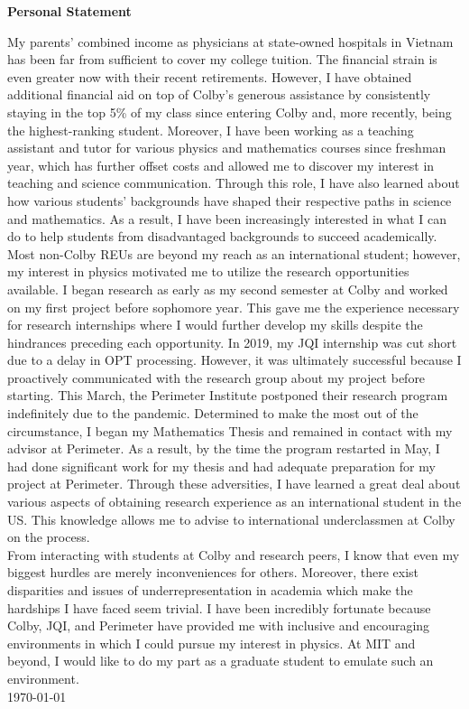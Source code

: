 \documentclass[12pt]{article}
\begin{document}
\begin{center}
	\textbf{Personal Statement}
\end{center}
My parents' combined income as physicians at state-owned hospitals in Vietnam has been far from sufficient to cover my college tuition. The financial strain is even greater now with their recent retirements. However,  I have obtained additional financial aid on top of Colby's generous assistance by consistently staying in the top 5\% of my class since entering Colby and, more recently, being the highest-ranking student. Moreover, I have been working as a teaching assistant and tutor for various physics and mathematics courses since freshman year, which has further offset costs and allowed me to discover my interest in teaching and science communication. Through this role, I have also learned about how various students' backgrounds have shaped their respective paths in science and mathematics. As a result, I have been increasingly interested in what I can do to help students from disadvantaged backgrounds to succeed academically. \\

Most non-Colby REUs are beyond my reach as an international student; however, my interest in physics motivated me to utilize the research opportunities available. I began research as early as my second semester at Colby and worked on my first project before sophomore year. This gave me the experience necessary for research internships where I would further develop my skills despite the hindrances preceding each opportunity. In 2019, my JQI internship was cut short due to a delay in OPT processing. However, it was ultimately successful because I proactively communicated with the research group about my project before starting. This March, the Perimeter Institute postponed their research program indefinitely due to the pandemic. Determined to make the most out of the circumstance, I began my Mathematics Thesis and remained in contact with my advisor at Perimeter. As a result, by the time the program restarted in May, I had done significant work for my thesis and had adequate preparation for my project at Perimeter. Through these adversities, I have learned a great deal about various aspects of obtaining research experience as an international student in the US. This knowledge allows me to advise to international underclassmen at Colby on the process.\\

From interacting with students at Colby and research peers, I know that even my biggest hurdles are merely inconveniences for others. Moreover, there exist disparities and issues of underrepresentation in academia which make the hardships I have faced seem trivial. I have been incredibly fortunate because Colby, JQI, and Perimeter have provided me with inclusive and encouraging environments in which I could pursue my interest in physics. At MIT and beyond, I would like to do my part as a graduate student to emulate such an environment.\\

\noindent \today
\end{document}
